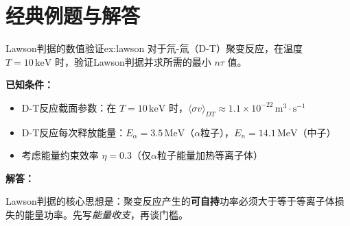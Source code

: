 ﻿%


\section{经典例题与解答}

\begin{example}{Lawson判据的数值验证}{ex:lawson}
对于氘-氚（D-T）聚变反应，在温度 $T=10\,\mathrm{keV}$ 时，验证Lawson判据并求所需的最小 $n\tau$ 值。
\end{example}

\textbf{已知条件：}
\begin{itemize}
    \item D-T反应截面参数：在 $T=10\,\mathrm{keV}$ 时，$\langle\sigma v\rangle_{DT} \approx 1.1\times10^{-22}\,\mathrm{m^3\cdot s^{-1}}$
    \item D-T反应每次释放能量：$E_{\alpha}=3.5\,\mathrm{MeV}$（$\alpha$粒子），$E_n=14.1\,\mathrm{MeV}$（中子）
    \item 考虑能量约束效率 $\eta=0.3$（仅$\alpha$粒子能量加热等离子体）
\end{itemize}

\textbf{解答：}

Lawson判据的核心思想是：聚变反应产生的\textbf{可自持}功率必须大于等于等离子体损失的能量功率。先写\emph{能量收支}，再谈门槛。

